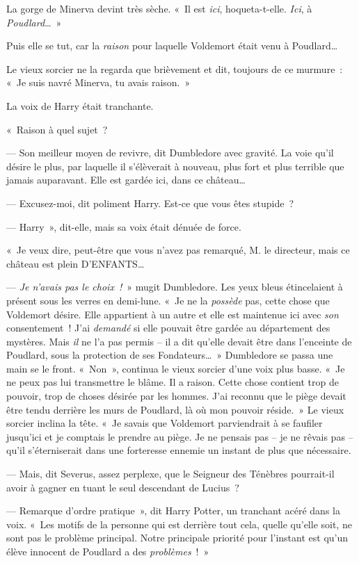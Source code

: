 La gorge de Minerva devint très sèche.
«~Il est \emph{ici}, hoqueta-t-elle.
\emph{Ici}, à \emph{Poudlard}…~»

Puis elle se tut, car la \emph{raison} pour laquelle Voldemort était venu à Poudlard…

Le vieux sorcier ne la regarda que brièvement et dit, toujours de ce murmure~: «~Je suis navré Minerva, tu avais raison.~»

La voix de Harry était tranchante.

«~Raison à quel sujet~?

--- Son meilleur moyen de revivre, dit Dumbledore avec gravité.
La voie qu'il désire le plus, par laquelle il s'élèverait à nouveau, plus fort et plus terrible que jamais auparavant.
Elle est gardée ici, dans ce château…

--- Excusez-moi, dit poliment Harry.
Est-ce que vous êtes stupide~?

--- Harry~», dit-elle, mais sa voix était dénuée de force.

«~Je veux dire, peut-être que vous n'avez pas remarqué, M. le directeur, mais ce château est plein D'ENFANTS…

--- \emph{Je n'avais pas le choix~!}~» mugit Dumbledore.
Les yeux bleus étincelaient à présent sous les verres en demi-lune.
«~Je ne la \emph{possède} pas, cette chose que Voldemort désire.
Elle appartient à un autre et elle est maintenue ici avec \emph{son} consentement~!
J'ai \emph{demandé} si elle pouvait être gardée au département des mystères.
Mais \emph{il} ne l'a pas permis -- il a dit qu'elle devait être dans l'enceinte de Poudlard, sous la protection de ses Fondateurs…~»
Dumbledore se passa une main se le front.
«~Non~», continua le vieux sorcier d'une voix plus basse.
«~Je ne peux pas lui transmettre le blâme.
Il a raison.
Cette chose contient trop de pouvoir, trop de choses désirée par les hommes.
J'ai reconnu que le piège devait être tendu derrière les murs de Poudlard, là où mon pouvoir réside.~»
Le vieux sorcier inclina la tête.
«~Je savais que Voldemort parviendrait à se faufiler jusqu'ici et je comptais le prendre au piège.
Je ne pensais pas -- je ne rêvais pas -- qu'il s'éterniserait dans une forteresse ennemie un instant de plus que nécessaire.

--- Mais, dit Severus, assez perplexe, que le Seigneur des Ténèbres pourrait-il avoir à gagner en tuant le seul descendant de Lucius~?

--- Remarque d'ordre pratique~», dit Harry Potter, un tranchant acéré dans la voix.
«~Les motifs de la personne qui est derrière tout cela, quelle qu'elle soit, ne sont pas le problème principal.
Notre principale priorité pour l'instant est qu'un élève innocent de Poudlard a des \emph{problèmes}~!~»

